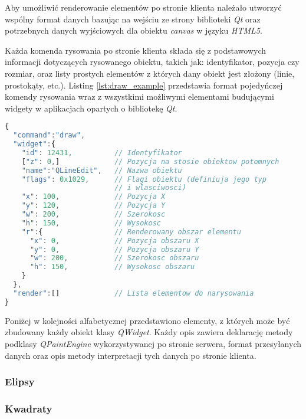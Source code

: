 
Aby umożliwić renderowanie elementów po stronie klienta należało utworzyć wspólny format danych bazując na wejściu ze strony biblioteki \emph{Qt} oraz potrzebnych danych wyjściowych dla obiektu \emph{canvas} w języku \emph{HTML5}. 

Każda komenda rysowania po stronie klienta składa się z podstawowych informacji dotyczących rysowanego obiektu, takich jak: identyfikator, pozycja czy rozmiar, oraz listy prostych elementów z których dany obiekt jest złożony (linie, prostokąty, etc.). Listing \ref{lst:draw_example} przedstawia format pojedyńczej komendy rysowania wraz z wszystkimi możliwymi elementami budującymi widgety w aplikacjach opartych o bibliotekę \emph{Qt}.


\begin{lstlisting}[language=JavaScript,numbers=none,caption=Komenda renderowania elementu interfejsu,label={lst:draw_example}]
{
  "command":"draw",
  "widget":{
    "id": 12431,          // Identyfikator
    ["z": 0,]             // Pozycja na stosie obiektow potomnych
    "name":"QLineEdit",   // Nazwa obiektu
    "flags": 0x1029,      // Flagi obiektu (definiuja jego typ 
                          // i wlasciwosci)
    "x": 100,             // Pozycja X
    "y": 120,             // Pozycja Y
    "w": 200,             // Szerokosc
    "h": 150,             // Wysokosc
    "r":{                 // Renderowany obszar elementu
      "x": 0,             // Pozycja obszaru X
      "y": 0,             // Pozycja obszaru Y
      "w": 200,           // Szerokosc obszaru
      "h": 150,           // Wysokosc obszaru
    }
  },
  "render":[]             // Lista elementow do narysowania
}
\end{lstlisting}

Poniżej w kolejności alfabetycznej przedstawiono elementy, z których może być zbudowany każdy obiekt klasy \emph{QWidget}. Każdy opis zawiera deklarację metody podklasy \emph{QPaintEngine} wykorzystywanej po stronie serwera, format przesyłanych danych oraz opis metody interpretacji tych danych po stronie klienta.

\subsubsection{Elipsy}


\subsubsection{Kwadraty}


